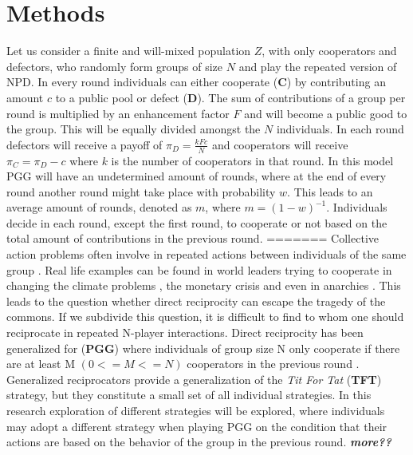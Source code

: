 \documentclass[letterpaper]{article}
\begin{document}
\section{Methods}
Let us consider a finite and will-mixed population $Z$, with only cooperators and defectors, who randomly form groups of size $N$ and play the repeated version of NPD. In every round individuals can either cooperate (\textbf{C}) by contributing an amount $c$ to a public pool or defect (\textbf{D}). The sum of contributions of a group per round is multiplied by an enhancement factor $F$ and will become a public good to the group. This will be equally divided amongst  the $N$ individuals. In each round defectors will receive a payoff of $\pi_{D}= \frac{kFc}{N}$  and cooperators will receive $\pi_{C}=\pi_{D}-c$ where $k$ is the number of cooperators in that round. In this model PGG will have an undetermined amount of rounds, where at the end of every round another round might take place with probability $w$. This leads to an average amount of rounds, denoted as $m$, where $m= (1-w)^{-1}$. Individuals decide in each round, except the first round, to cooperate or not based on the total amount of contributions in the previous round.
=======
Collective action problems often involve in repeated actions between individuals of the same group \citep{boyd1988evolution}. Real life examples can be found in world leaders trying to cooperate in changing the climate problems \citep{milinski2008collective,barrett2012climate}, the monetary crisis \citep{jacquet2001economic} and even in anarchies \citep{axelrod1985achieving}. This leads to the question whether direct reciprocity can escape the tragedy of the commons. If we subdivide this question, it is difficult to find to whom one should reciprocate in repeated N-player interactions. Direct reciprocity has been generalized for (\textbf{PGG}) where individuals of group size N only cooperate if there are at least M $(0<=M<=N)$ cooperators in the previous round \citep{van2012emergence,kurokawa2009emergence}. Generalized reciprocators provide a generalization of the \textit{Tit For Tat}  (\textbf{TFT}) strategy, but they constitute a small set of all individual strategies.
In this research exploration of different strategies will be explored, where individuals may adopt a different strategy when playing PGG on the condition that their actions are based on the behavior of the group in the previous round.
\textit{\textbf{more??}}
\end{document}

